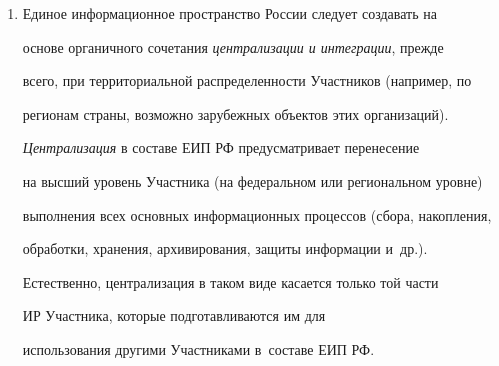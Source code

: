 \begin{enumerate}[1.]

     \item  Единое информационное пространство России следует создавать на

основе органичного сочетания \textit{централизации и интеграции}, прежде

всего, при территориальной распределенности Участников (например, по

регионам страны, возможно зарубежных объектов этих организаций).



     \textit{Централизация} в составе ЕИП РФ предусматривает перенесение

на высший уровень Участника (на федеральном или региональном уровне)

выполнения всех основных информационных процессов (сбора, накопления,

обработки, хранения, архивирования, защиты информации и~др.).



     Естественно, централизация в таком виде касается только той части

ИР Участника, которые подготавливаются им для

использования другими Участниками в~составе ЕИП РФ.




\end{enumerate}
